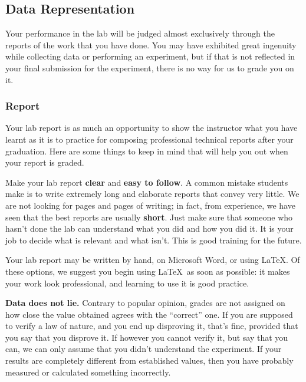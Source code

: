 \subsection{Data Representation}

Your performance in the lab will be judged almost exclusively through the reports of the work that you have done. You may have exhibited great ingenuity while collecting data or performing an experiment, but if that is not reflected in your final submission for the experiment, there is no way for us to grade you on it.

\subsubsection{Report}

Your lab report is as much an opportunity to show the instructor what you have learnt as it is to practice for composing professional technical reports after your graduation. Here are some things to keep in mind that will help you out when your report is graded.

Make your lab report \textbf{clear} and \textbf{easy to follow}. A common mistake students make is to write extremely long and elaborate reports that convey very little. We are not looking for pages and pages of writing; in fact, from experience, we have seen that the best reports are usually \textbf{short}. Just make sure that someone who hasn't done the lab can understand what you did and how you did it. It is your job to decide what is relevant and what isn't. This is good training for the future. 

\begin{imp}
Your lab report may be written by hand, on Microsoft Word, or using \LaTeX. Of these options, we suggest you begin using \LaTeX\, as soon as possible: it makes your work look professional, and learning to use it is good practice.
\end{imp}

\textbf{Data does not lie.} Contrary to popular opinion, grades are not assigned on how close the value obtained agrees with the ``correct'' one. If you are supposed to verify a law of nature, and you end up disproving it, that's fine, provided that you say that you disprove it. If however you cannot verify it, but say that you can, we can only assume that you didn't understand the experiment. If your results are completely different from established values, then you have probably measured or calculated something incorrectly. 

